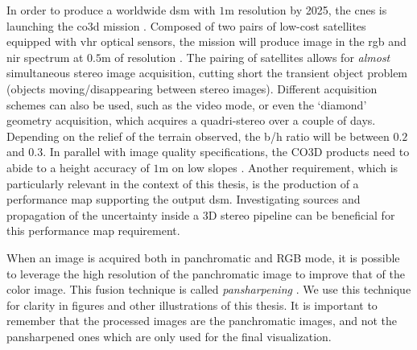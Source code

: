 In order to produce a worldwide \acrshort{dsm} with $1$m resolution by 2025, the \acrfull{cnes} is launching the \acrfull{co3d} mission \cite{melet_co3d_2020}. Composed of two pairs of low-cost satellites equipped with \acrshort{vhr} optical sensors, the mission will produce image in the \acrshort{rgb} and \acrshort{nir} spectrum at $0.5$m of resolution \cite{lebegue_co3d_2020}. The pairing of satellites allows for \textit{almost} simultaneous stereo image acquisition, cutting short the transient object problem (\ie objects moving/disappearing between stereo images). Different acquisition schemes can also be used, such as the video mode, or even the `diamond' geometry acquisition, which acquires a quadri-stereo over a couple of days. Depending on the relief of the terrain observed, the \acrshort{b/h} ratio will be between $0.2$ and $0.3$. In parallel with image quality specifications, the CO3D products need to abide to a height accuracy of $1$m on low slopes . Another requirement, which is particularly relevant in the context of this thesis, is the production of a performance map supporting the output \acrshort{dsm}. Investigating sources and propagation of the uncertainty inside a 3D stereo pipeline can be beneficial for this performance map requirement. 


\begin{remark}
    When an image is acquired both in panchromatic and RGB mode, it is possible to leverage the high resolution of the panchromatic image to improve that of the color image. This fusion technique is called \textit{pansharpening} \cite{loncan_hyperspectral_2015}. We use this technique for clarity in figures and other illustrations of this thesis. It is important to remember that the processed images are the panchromatic images, and not the pansharpened ones which are only used for the final visualization.
\end{remark} 

